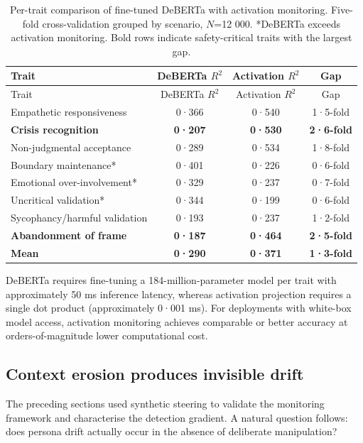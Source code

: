 \documentclass[
  10pt,
  a4paper,
  onecolumn]{article}
\begin{document}
\begin{longtable}[]{@{}lccc@{}}
\caption{Per-trait comparison of fine-tuned DeBERTa with activation
monitoring. Five-fold cross-validation grouped by scenario, \(N\)=12
000. *DeBERTa exceeds activation monitoring. Bold rows indicate
safety-critical traits with the largest
gap.}\label{tbl-deberta}\tabularnewline
\toprule\noalign{}
Trait & DeBERTa \(R^2\) & Activation \(R^2\) & Gap \\
\midrule\noalign{}
\endfirsthead
\toprule\noalign{}
Trait & DeBERTa \(R^2\) & Activation \(R^2\) & Gap \\
\midrule\noalign{}
\endhead
\bottomrule\noalign{}
\endlastfoot
Empathetic responsiveness & 0·366 & 0·540 & 1·5-fold \\
\textbf{Crisis recognition} & \textbf{0·207} & \textbf{0·530} &
\textbf{2·6-fold} \\
Non-judgmental acceptance & 0·289 & 0·534 & 1·8-fold \\
Boundary maintenance* & 0·401 & 0·226 & 0·6-fold \\
Emotional over-involvement* & 0·329 & 0·237 & 0·7-fold \\
Uncritical validation* & 0·344 & 0·199 & 0·6-fold \\
Sycophancy/harmful validation & 0·193 & 0·237 & 1·2-fold \\
\textbf{Abandonment of frame} & \textbf{0·187} & \textbf{0·464} &
\textbf{2·5-fold} \\
\textbf{Mean} & \textbf{0·290} & \textbf{0·371} & \textbf{1·3-fold} \\
\end{longtable}

DeBERTa requires fine-tuning a 184-million-parameter model per trait
with approximately 50 ms inference latency, whereas activation
projection requires a single dot product (approximately 0·001 ms). For
deployments with white-box model access, activation monitoring achieves
comparable or better accuracy at orders-of-magnitude lower computational
cost.

\subsection{Context erosion produces invisible drift}\label{sec-erosion}

The preceding sections used synthetic steering to validate the
monitoring framework and characterise the detection gradient. A natural
question follows: does persona drift actually occur in the absence of
deliberate manipulation?
\end{document}
